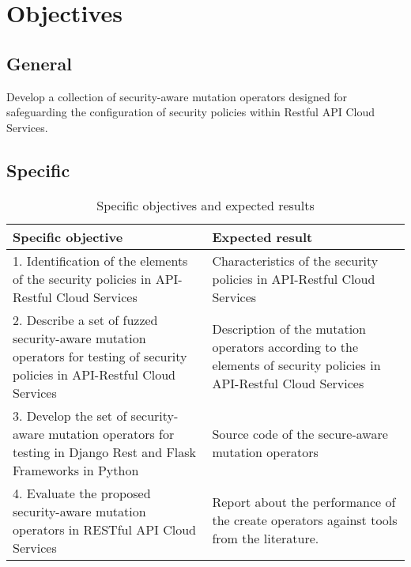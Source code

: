 \section{Objectives}

\subsection{General}

Develop a collection of security-aware mutation operators designed for safeguarding the configuration of security policies within Restful API Cloud Services.
\subsection{Specific}

\begin{table}[H]
    \centering
    \begin{tabular}{|p{}|p{}|}
        \hline
         \textbf{Specific objective} & \textbf{Expected result} \\ \hline
         1.  Identification of the elements of the security policies in API-Restful Cloud Services &  Characteristics of the security policies in API-Restful Cloud Services  \\  \hline
         2. Describe a set of fuzzed security-aware mutation operators for testing of security policies in API-Restful Cloud Services & Description of the mutation operators according to the elements of security policies in API-Restful Cloud Services  \\  \hline
         3. Develop the set of security-aware mutation operators for testing in Django Rest and Flask Frameworks in Python    & Source code of the secure-aware mutation operators \\  \hline
         4. Evaluate the proposed security-aware mutation operators in RESTful API Cloud Services & Report about the performance of the create operators against tools from the literature.
         \\ \hline
    \end{tabular}
    \caption{Specific objectives and expected results}
    \label{tab:objetivos}
\end{table}
